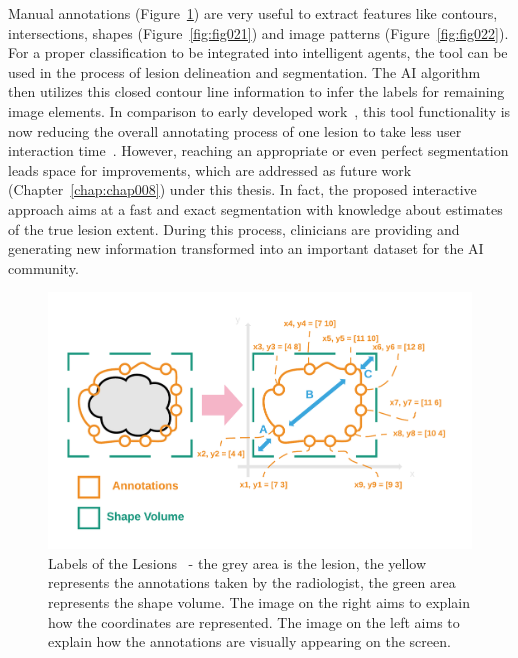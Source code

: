Manual annotations (Figure~\ref{fig:fig007}) are very useful to extract features like contours, intersections, shapes (Figure~\ref{fig:fig021}) and image patterns (Figure~\ref{fig:fig022}).
For a proper classification to be integrated into intelligent agents, the tool can be used in the process of lesion delineation and segmentation.
The \ac{AI} algorithm then utilizes this closed contour line information to infer the labels for remaining image elements.
In comparison to early developed work~\cite{calisto2017mimbcdui}, this tool functionality is now reducing the overall annotating process of one lesion to take less user interaction time~\cite{10.1145/3132272.3134111, 10.1145/3399715.3399744}.
However, reaching an appropriate or even perfect segmentation leads space for improvements, which are addressed as future work (Chapter~\ref{chap:chap008}) under this thesis.
In fact, the proposed interactive approach aims at a fast and exact segmentation with knowledge about estimates of the true lesion extent.
During this process, clinicians are providing and generating new information transformed into an important dataset for the \ac{AI} community.

\begin{figure}[ht]
\centering
\includegraphics[width=\textwidth]{images/fig007}
\caption{Labels of the Lesions~\cite{nadia2020maivell} - the grey area is the lesion, the yellow represents the annotations taken by the radiologist, the green area represents the shape volume. The image on the right aims to explain how the coordinates are represented. The image on the left aims to explain how the annotations are visually appearing on the screen.}
\label{fig:fig007}
\end{figure}

